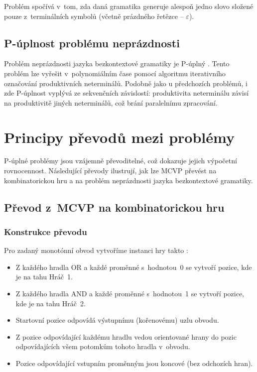 Problém spočívá v~tom, zda daná gramatika generuje alespoň jedno slovo složené pouze z~terminálních symbolů (včetně prázdného řetězce -- $\varepsilon$).

\subsection{P-úplnost problému neprázdnosti}
\label{sec:GrammarsTheoryCompleteness}

Problém neprázdnosti jazyka bezkontextové gramatiky je P-úplný \cite{sawa, miyano}. Tento problém lze vyřešit v~polynomiálním čase pomocí algoritmu iterativního označování produktivních neterminálů. Podobně jako u předchozích problémů, i zde P-úplnost vyplývá ze sekvenčních závislostí: produktivita neterminálu závisí na produktivitě jiných neterminálů, což brání paralelnímu zpracování.

\section{Principy převodů mezi problémy}
\label{sec:TheoryReductions}

P-úplné problémy jsou vzájemně převoditelné, což dokazuje jejich výpočetní rovnocennost. Následující převody ilustrují, jak lze MCVP převést na kombinatorickou hru a na problém neprázdnosti jazyka bezkontextové gramatiky.

\subsection{Převod z~MCVP na kombinatorickou hru}
\label{sec:TheoryReductionToGame}

\subsubsection*{Konstrukce převodu}
Pro zadaný monotónní obvod vytvoříme instanci hry takto \cite{sawa}:

\begin{itemize}
    \item Z každého hradla OR a každé proměnné s~hodnotou~0 se vytvoří pozice, kde je na tahu Hráč~1.
    \item Z každého hradla AND a každé proměnné s~hodnotou~1 se vytvoří pozice, kde je na tahu Hráč~2.
    \item Startovní pozice odpovídá výstupnímu (kořenovému) uzlu obvodu.
    \item Z pozice odpovídající každému hradlu vedou orientované hrany do pozic odpovídajících všem potomkům tohoto hradla v~obvodu.
    \item Pozice odpovídající vstupním proměnným jsou koncové (bez odchozích hran).
\end{itemize}

